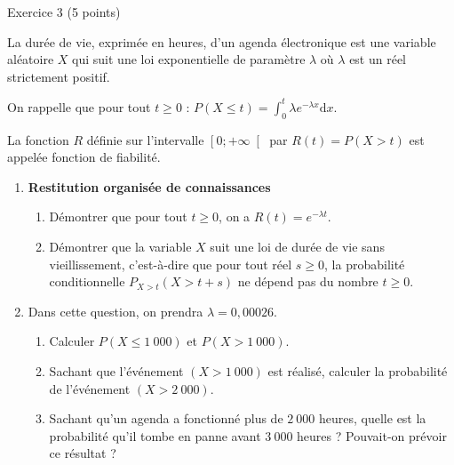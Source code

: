 
\begin{h2}Exercice 3 (5 points)\end{h2}
La durée de vie, exprimée en heures, d'un agenda électronique est une variable aléatoire $X$ qui suit une loi exponentielle de paramètre $\lambda $ où $\lambda $ est un réel strictement positif.
\par
On rappelle que pour tout $t \geqslant 0$ : $P\left(X \leqslant t\right)= \int_{0}^{t} \lambda  e^{-\lambda  x} \text{d}x$.
\par
La fonction $R$ définie sur l'intervalle $\left[0 ; +\infty \right[$ par $R\left(t\right)=P\left(X > t\right)$ est appelée fonction de fiabilité.
\begin{enumerate}
     \item \textbf{Restitution organisée de connaissances}
     \begin{enumerate}[label=\alph*.]
          \item Démontrer que pour tout $t \geqslant 0$, on a $R\left(t\right)=e^{-\lambda  t}$.
          \item Démontrer que la variable  $X$ suit une loi de durée de vie sans vieillissement, c'est-à-dire que pour tout réel $s \geqslant 0$, la probabilité conditionnelle $P_{X > t}\left(X > t+s\right)$ ne dépend pas du nombre $t \geqslant 0$.
     \end{enumerate}
     \item Dans cette question, on prendra $\lambda =0,00026$.
     \begin{enumerate}[label=\alph*.]
          \item Calculer $P\left(X \leqslant 1~000\right)$ et $P\left(X > 1~000\right)$.
          \item Sachant que l'événement $\left(X > 1~000\right)$ est réalisé, calculer la probabilité de l'événement $\left(X > 2~000\right)$.
          \item Sachant qu'un agenda a fonctionné plus de $2~000$ heures, quelle est la probabilité qu'il tombe en panne avant $3~000$ heures ? Pouvait-on prévoir ce résultat ?
     \end{enumerate}
\end{enumerate}
